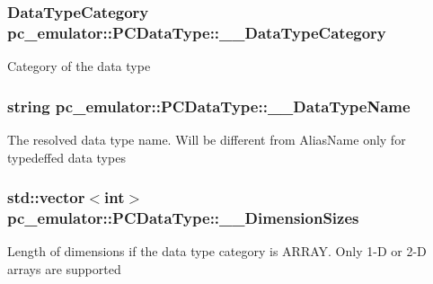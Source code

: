 \subsubsection[{\texorpdfstring{\+\_\+\+\_\+\+Data\+Type\+Category}{__DataTypeCategory}}]{\setlength{\rightskip}{0pt plus 5cm}Data\+Type\+Category pc\+\_\+emulator\+::\+P\+C\+Data\+Type\+::\+\_\+\+\_\+\+Data\+Type\+Category}\hypertarget{classpc__emulator_1_1PCDataType_acd8e485e5e6c2cdddab8efd8bcbabfe3}{}\label{classpc__emulator_1_1PCDataType_acd8e485e5e6c2cdddab8efd8bcbabfe3}
Category of the data type 
\subsubsection[{\texorpdfstring{\+\_\+\+\_\+\+Data\+Type\+Name}{__DataTypeName}}]{\setlength{\rightskip}{0pt plus 5cm}string pc\+\_\+emulator\+::\+P\+C\+Data\+Type\+::\+\_\+\+\_\+\+Data\+Type\+Name}\hypertarget{classpc__emulator_1_1PCDataType_a2e2d09be945e543baec1ce4f5dbdb305}{}\label{classpc__emulator_1_1PCDataType_a2e2d09be945e543baec1ce4f5dbdb305}
The resolved data type name. Will be different from Alias\+Name only for typedeffed data types 
\subsubsection[{\texorpdfstring{\+\_\+\+\_\+\+Dimension\+Sizes}{__DimensionSizes}}]{\setlength{\rightskip}{0pt plus 5cm}std\+::vector$<$int$>$ pc\+\_\+emulator\+::\+P\+C\+Data\+Type\+::\+\_\+\+\_\+\+Dimension\+Sizes}\hypertarget{classpc__emulator_1_1PCDataType_a325bb0ecb84506cf78ef1a53cdbe2945}{}\label{classpc__emulator_1_1PCDataType_a325bb0ecb84506cf78ef1a53cdbe2945}
Length of dimensions if the data type category is A\+R\+R\+AY. Only 1-\/D or 2-\/D arrays are supported 
